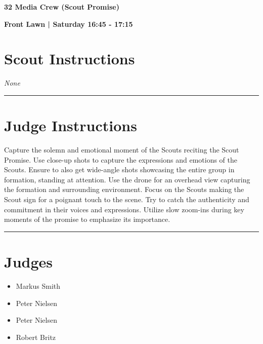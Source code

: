 \documentclass[10pt]{article}
\newcommand{\newtitle}[1]{\begin{center}{\Huge\bfseries #1 }\\ \vspace{5mm}\end{center}}
\newcommand{\newsubtitle}[1]{\begin{center}{\color{grey}\Large\bfseries #1 }\\ \vspace{5mm}\end{center}}
\begin{document}
	\vspace{1cm}


	\clearpage
		\newtitle{32 Media Crew (Scout Promise) }
	\newsubtitle{Front Lawn | Saturday 16:45 - 17:15}
		\setcounter{section}{31}
	\section*{Scout Instructions}
		\textit{None}
	
	\vspace{0.5cm}
	\hrule
	\vspace{0.5cm}

		\section*{Judge Instructions}
		Capture the solemn and emotional moment of the Scouts reciting the Scout Promise. Use close-up shots to capture the expressions and emotions of the Scouts. Ensure to also get wide-angle shots showcasing the entire group in formation, standing at attention. Use the drone for an overhead view capturing the formation and surrounding environment. Focus on the Scouts making the Scout sign for a poignant touch to the scene. Try to catch the authenticity and commitment in their voices and expressions. Utilize slow zoom-ins during key moments of the promise to emphasize its importance.
\vspace{0.5cm}
	\hrule
	\vspace{0.5cm}
		\section*{\faUsers \: Judges}

		

	\begin{multicols}{2}

		\begin{itemize}
									\item Markus Smith
									\item Peter Nielsen
						\end{itemize}

		\vfill\null
		\columnbreak

		\begin{itemize}
									\item Peter Nielsen
									\item Robert Britz
						\end{itemize}

		\vfill\null

		\end{multicols}
\end{document}

